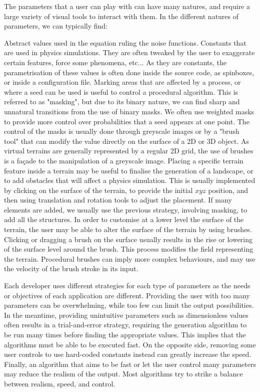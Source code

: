 The parameters that a user can play with can have many natures, and require a large variety of visual tools to interact with them. In the different natures of parameters, we can typically find:
\begin{Itemize}
     Abstract values used in the equation ruling the noise functions.
     Constants that are used in physics simulations. They are often tweaked by the user to exaggerate certain features, force some phenomena, etc... As they are constants, the parametrisation of these values is often done inside the source code, as spinboxes, or inside a configuration file.
     Marking areas that are affected by a process, or where a seed can be used is useful to control a procedural algorithm. This is referred to as "masking", but due to its binary nature, we can find sharp and unnatural transitions from the use of binary masks. We often use weighted masks to provide more control over probabilities that a seed appears at one point. The control of the masks is usually done through greyscale images or by a "brush tool" that can modify the value directly on the surface of a 2D or 3D object. As virtual terrains are generally represented by a regular 2D grid, the use of brushes is a façade to the manipulation of a greyscale image.
     Placing a specific terrain feature inside a terrain may be useful to finalise the generation of a landscape, or to add obstacles that will affect a physics simulation. This is usually implemented by clicking on the surface of the terrain, to provide the initial $xyz$ position, and then using translation and rotation tools to adjust the placement. If many elements are added, we usually use the previous strategy, involving masking, to add all the structures.
     In order to customise at a lower level the surface of the terrain, the user may be able to alter the surface of the terrain by using brushes. Clicking or dragging a brush on the surface usually results in the rise or lowering of the surface level around the brush. This process modifies the field representing the terrain. Procedural brushes can imply more complex behaviours, and may use the velocity of the brush stroke in its input.
\end{Itemize}

Each developer uses different strategies for each type of parameters as the needs or objectives of each application are different. Providing the user with too many parameters can be overwhelming, while too few can limit the output possibilities. In the meantime, providing unintuitive parameters such as dimensionless values often results in a trial-and-error strategy, requiring the generation algorithm to be run many times before finding the appropriate values. This implies that the algorithms must be able to be executed fast. On the opposite side, removing some user controls to use hard-coded constants instead can greatly increase the speed. Finally, an algorithm that aims to be fast or let the user control many parameters may reduce the realism of the output. Most algorithms try to strike a balance between realism, speed, and control.

